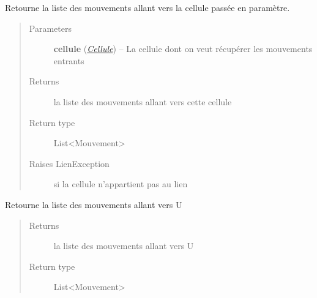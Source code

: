 \documentclass[letterpaper,10pt,english]{sphinxmanual}
\begin{document}
\begin{fulllineitems}
\begin{fulllineitems}
\end{fulllineitems}


\begin{fulllineitems}
\label{index:Lien.Lien.getMouvementsVersCellule}
Retourne la liste des mouvements allant vers la cellule passée en paramètre.
\begin{quote}\begin{description}
\item[{Parameters}] \leavevmode
\textbf{cellule} ({\hyperref[index:module-Cellule]{\emph{Cellule}}}) -- La cellule dont on veut récupérer les mouvements entrants

\item[{Returns}] \leavevmode
la liste des mouvements allant vers cette cellule

\item[{Return type}] \leavevmode
List\textless{}Mouvement\textgreater{}

\item[{Raises LienException}] \leavevmode
si la cellule n'appartient pas au lien

\end{description}\end{quote}

\end{fulllineitems}


\begin{fulllineitems}
\label{index:Lien.Lien.getMouvementsVersU}
Retourne la liste des mouvements allant vers U
\begin{quote}\begin{description}
\item[{Returns}] \leavevmode
la liste des mouvements allant vers U

\item[{Return type}] \leavevmode
List\textless{}Mouvement\textgreater{}

\end{description}\end{quote}

\end{fulllineitems}



\end{fulllineitems}
\end{document}
